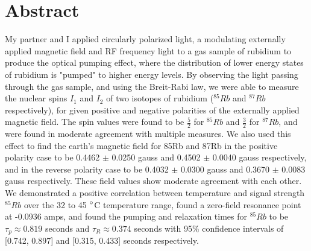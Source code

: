 \documentclass{article}
\begin{document}
\section{Abstract}
    My partner and I applied circularly polarized light, a modulating externally applied magnetic field and RF frequency light to a gas sample of rubidium to produce the optical pumping effect, where the distribution of lower energy states of rubidium is "pumped" to higher energy levels. By observing the light passing through the gas sample, and using the Breit-Rabi law, we were able to measure the nuclear spins $I_1$ and $I_2$ of two isotopes of rubidium ($^{85}Rb$ and $^{87}Rb$ respectively), for given positive and negative polarities of the externally applied magnetic field. The spin values were found to be $\frac{5}{2}$ for $^{85}Rb$ and $\frac{3}{2}$ for $^{87}Rb$, and were found in moderate agreement with multiple measures. We also used this effect to find the earth's magnetic field for 85Rb and 87Rb in the positive polarity case to be 0.4462 $\pm$ 0.0250 gauss and 0.4502 $\pm$ 0.0040 gauss respectively, and in the reverse polarity case to be 0.4032 $\pm$ 0.0300 gauss and 0.3670 $\pm$ 0.0083 gauss respectively. These field values show moderate agreement with each other. We demonstrated a positive correlation between temperature and signal strength $^{85}Rb$ over the 32 to 45 $\degree$C temperature range, found a zero-field resonance point at -0.0936 amps, and found the pumping and relaxation times for $^{85}Rb$ to be $\tau_p \approx 0.819$ seconds and $\tau_R \approx 0.374$ seconds with 95$\%$ confidence intervals of [0.742, 0.897] and [0.315, 0.433] seconds respectively.
\end{document}
